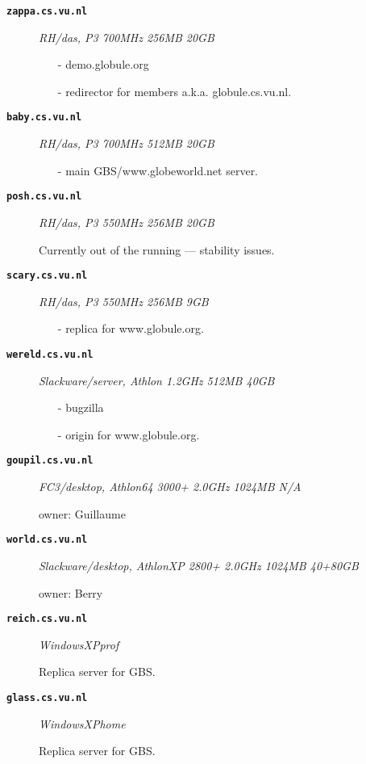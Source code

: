 \documentclass[10pt,twoside]{article}
\begin{document}
\begin{description}
\item[\bf\tt zappa.cs.vu.nl]
  \textit{\scriptsize RH/das, P3 700MHz 256MB 20GB}

  \begin{itemize}
  \item[-] demo.globule.org
  \item[-] redirector for members a.k.a. globule.cs.vu.nl.
  \end{itemize}

\item[\bf\tt baby.cs.vu.nl]
  \textit{\scriptsize RH/das, P3 700MHz 512MB 20GB}

  \begin{itemize}
  \item[-] main GBS/www.globeworld.net server.
  \end{itemize}

\item[\bf\tt posh.cs.vu.nl]
  \textit{\scriptsize RH/das, P3 550MHz 256MB 20GB}

  Currently out of the running --- stability issues.

\item[\bf\tt scary.cs.vu.nl]
  \textit{\scriptsize RH/das, P3 550MHz 256MB 9GB}

  \begin{itemize}
  \item[-] replica for www.globule.org.
  \end{itemize}

\item[\bf\tt wereld.cs.vu.nl]
  \textit{\scriptsize Slackware/server, Athlon 1.2GHz 512MB 40GB}

  \begin{itemize}
  \item[-] bugzilla
  \item[-] origin for www.globule.org.
  \end{itemize}

\item[\bf\tt goupil.cs.vu.nl]
  \textit{\scriptsize FC3/desktop, Athlon64 3000+ 2.0GHz 1024MB N/A}

  owner: Guillaume

\item[\bf\tt world.cs.vu.nl]
  \textit{\scriptsize Slackware/desktop, AthlonXP 2800+ 2.0GHz 1024MB 40+80GB}

  owner: Berry

\item[\bf\tt reich.cs.vu.nl]
  \textit{\scriptsize WindowsXPprof}

  Replica server for GBS.

\item[\bf\tt glass.cs.vu.nl]
  \textit{\scriptsize WindowsXPhome}

  Replica server for GBS.

\end{description}
\end{document}
